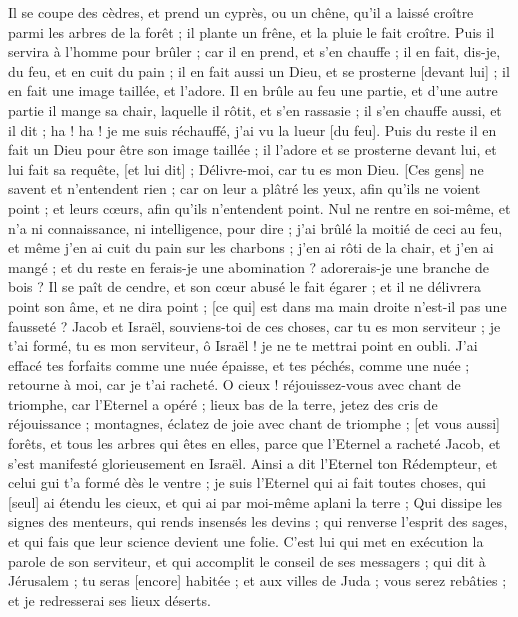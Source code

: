 \begin{multicols}{2}
Il se coupe des cèdres, et prend un cyprès, ou un chêne, qu'il a laissé croître parmi les arbres de la forêt ; il plante un frêne, et la pluie le fait croître.
Puis il servira à l'homme pour brûler ; car il en prend, et s'en chauffe ; il en fait, dis-je, du feu, et en cuit du pain ; il en fait aussi un Dieu, et se prosterne [devant lui] ; il en fait une image taillée, et l'adore.
Il en brûle au feu une partie, et d'une autre partie il mange sa chair, laquelle il rôtit, et s'en rassasie ; il s'en chauffe aussi, et il dit ; ha ! ha ! je me suis réchauffé, j'ai vu la lueur [du feu].
Puis du reste il en fait un Dieu pour être son image taillée ; il l'adore et se prosterne devant lui, et lui fait sa requête, [et lui dit] ; Délivre-moi, car tu es mon Dieu.
[Ces gens] ne savent et n'entendent rien ; car on leur a plâtré les yeux, afin qu'ils ne voient point ; et leurs cœurs, afin qu'ils n'entendent point.
Nul ne rentre en soi-même, et n'a ni connaissance, ni intelligence, pour dire ; j'ai brûlé la moitié de ceci au feu, et même j'en ai cuit du pain sur les charbons ; j'en ai rôti de la chair, et j'en ai mangé ; et du reste en ferais-je une abomination ? adorerais-je une branche de bois ?
Il se paît de cendre, et son cœur abusé le fait égarer ; et il ne délivrera point son âme, et ne dira point ; [ce qui] est dans ma main droite n'est-il pas une fausseté ?
Jacob et Israël, souviens-toi de ces choses, car tu es mon serviteur ; je t'ai formé, tu es mon serviteur, ô Israël ! je ne te mettrai point en oubli.
J'ai effacé tes forfaits comme une nuée épaisse, et tes péchés, comme une nuée ; retourne à moi, car je t'ai racheté.
O cieux ! réjouissez-vous avec chant de triomphe, car l'Eternel a opéré ; lieux bas de la terre, jetez des cris de réjouissance ; montagnes, éclatez de joie avec chant de triomphe ; [et vous aussi] forêts, et tous les arbres qui êtes en elles, parce que l'Eternel a racheté Jacob, et s'est manifesté glorieusement en Israël.
Ainsi a dit l'Eternel ton Rédempteur, et celui gui t'a formé dès le ventre ; je suis l'Eternel qui ai fait toutes choses, qui [seul] ai étendu les cieux, et qui ai par moi-même aplani la terre ;
Qui dissipe les signes des menteurs, qui rends insensés les devins ; qui renverse l'esprit des sages, et qui fais que leur science devient une folie.
C'est lui qui met en exécution la parole de son serviteur, et qui accomplit le conseil de ses messagers ; qui dit à Jérusalem ; tu seras [encore] habitée ; et aux villes de Juda ; vous serez rebâties ; et je redresserai ses lieux déserts.

\end{multicols}
